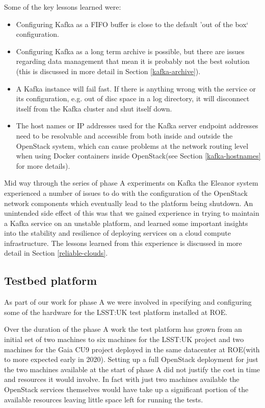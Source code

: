 \documentclass{article}
\newcommand{\docker} {Docker\xspace}
\newcommand{\openstack} {OpenStack\xspace}
\newcommand{\datacenter} {datacenter\xspace}
\newcommand{\kafka} {Kafka\xspace}
\newcommand{\fifo} {FIFO\xspace}
\newcommand{\phasea} {phase A\xspace}
\newcommand{\lsstuk} {LSST:UK\xspace}
\newcommand{\gaia} {Gaia\xspace}
\newcommand{\cunine} {CU9\xspace}
\newcommand{\roe} {ROE\xspace}
\newcommand{\testplatform} {test platform\xspace}
\newcommand{\eleanor} {Eleanor\xspace}
\begin{document}
Some of the key lessons learned were:
\begin{itemize}
    \item Configuring \kafka as a \fifo buffer is close to the default 'out of the box` configuration.
    \item Configuring \kafka as a long term archive is possible, but there are issues regarding data management that mean it is probably not the best solution (this is discussed in more detail in Section \ref{kafka-archive}). 
    \item A \kafka instance will fail fast. If there is anything wrong with the service or its configuration, e.g. out of disc space in a log directory, it will disconnect itself from the \kafka cluster and shut itself down.
    \item The host names or IP addresses used for the \kafka server endpoint addresses need to be resolvable and accessible from both inside and outside the \openstack system, which can cause problems at the network routing level when using \docker containers inside \openstack (see Section \ref{kafka-hostnames} for more details).
\end{itemize}

Mid way through the series of \phasea experiments on \kafka the \eleanor system experienced a number of issues to do with the configuration of the \openstack network components which eventually lead to the platform being shutdown.
An unintended side effect of this was that we gained experience in trying to maintain a \kafka service on an unstable platform, and learned some important insights into the stability and resilience of deploying services on a cloud compute infrastructure.
The lessons learned from this experience is discussed in more detail in Section \ref{reliable-clouds}.

\subsection{Testbed platform}
\label{deployment-testbed.platform}

As part of our work for \phasea we were involved in specifying and configuring some of the hardware for the \lsstuk \testplatform installed at \roe.

Over the duration of the \phasea work the \testplatform has grown from an initial set of two machines to six machines for the \lsstuk project and two machines for the \gaia \cunine project deployed in the same \datacenter at \roe (with to more expected early in 2020). Setting up a full \openstack deployment for just the two machines available at the start of \phasea did not justify the cost in time and resources it would involve. In fact with just two machines available the \openstack services themselves would have take up a significant portion of the available resources leaving little space left for running the tests.
\end{document}
